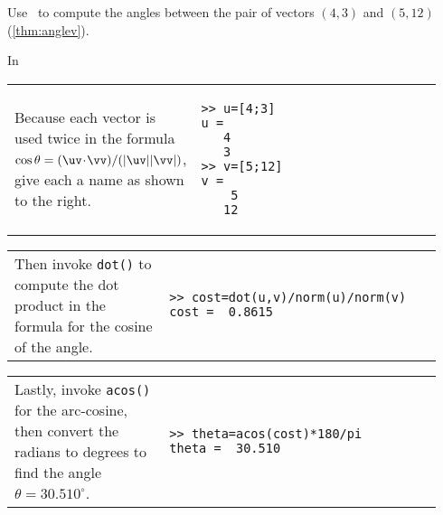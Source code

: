 \begin{example} \label{eg:}
Use \script\ to compute the angles between the pair of vectors \((4,3)\) and \((5,12)\) (\autoref{thm:anglev}).
\begin{solution} In \script

\begin{tabular}{@{}p{0.34\linewidth}p{0.6\linewidth}@{}}\raggedright
Because each vector is used twice in the formula \(\cos\theta=(\uv\cdot\vv)/(|\uv||\vv|)\), give each a name as shown to the right.
&\begin{verbatim}
>> u=[4;3]
u =
   4
   3
>> v=[5;12]
v =
    5
   12
\end{verbatim}
\end{tabular}
\setbox\ajrqrbox\hbox{}%
\marginpar{\usebox{\ajrqrbox\\[2ex]}}%

\begin{tabular}{@{}p{0.34\linewidth}p{0.6\linewidth}@{}}\raggedright
Then invoke \verb|dot()| to compute the dot product in the formula for the cosine of the angle.
&\begin{verbatim}
>> cost=dot(u,v)/norm(u)/norm(v)
cost =  0.8615
\end{verbatim}
\end{tabular}

\begin{tabular}{@{}p{0.34\linewidth}p{0.6\linewidth}@{}}\raggedright
Lastly, invoke \verb|acos()| for the arc-cosine, then convert the radians to degrees to find the angle \(\theta=30.510^\circ\).
&\begin{verbatim}
>> theta=acos(cost)*180/pi
theta =  30.510
\end{verbatim}
\end{tabular}

\end{solution}
\end{example}




